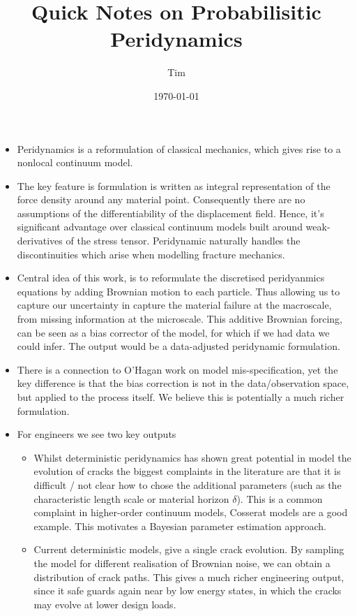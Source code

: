 \documentclass{article}
\title{Quick Notes on Probabilisitic Peridynamics}
\author{Tim}
\date{\today}
\begin{document}
\maketitle


\begin{itemize}

\section{Introduction}

\item Peridynamics is a reformulation of classical mechanics, which gives rise to a nonlocal continuum model.

\item The key feature is formulation is written as integral representation of the force density around any material point. Consequently there are no assumptions of the differentiability of the displacement field. Hence, it's significant advantage over classical continuum models built around weak-derivatives of the stress tensor. Peridynamic naturally handles the discontinuities which arise when modelling fracture mechanics.

\item Central idea of this work, is to reformulate the discretised peridyanmics equations by adding Brownian motion to each particle. Thus allowing us to capture our uncertainty in capture the material failure at the macroscale, from missing information at the microscale. This additive Brownian forcing, can be seen as a bias corrector of the model, for which if we had data we could infer. The output would be a data-adjusted peridynamic formulation.

\item There is a connection to O'Hagan work on model mis-specification, yet the key difference is that the bias correction is not in the data/observation space, but applied to the process itself. We believe this is potentially a much richer formulation.

\item For engineers we see two key outputs
\begin{itemize}
\item Whilst deterministic peridynamics has shown great potential in model the evolution of cracks the biggest complaints in the literature are that it is difficult / not clear how to chose the additional parameters (such as the characteristic length scale or material horizon $\delta$). This is a common complaint in higher-order continuum models, Cosserat models are a good example. This motivates a Bayesian parameter estimation approach.

\item Current deterministic models, give a single crack evolution. By sampling the model for different realisation of Brownian noise, we can obtain a distribution of crack paths. This gives a much richer engineering output, since it safe guards again near by low energy states, in which the cracks may evolve at lower design loads.

\end{itemize}


\end{itemize}
\end{document}
